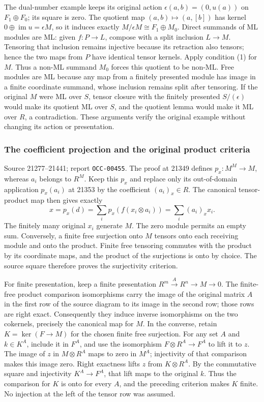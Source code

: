 The dual-number example keeps its original action \(\epsilon(a,b)=(0,u(a))\) on \(F_1\oplus F_0\); its square is zero. The quotient map \((a,b)\mapsto(a,[b])\) has kernel \(0\oplus\operatorname{im}u=\epsilon M\), so it induces exactly \(M/\epsilon M\cong F_1\oplus M_0\). Direct summands of ML modules are ML: given \(f:P\to L\), compose with a split inclusion \(L\to M\). Tensoring that inclusion remains injective because its retraction also tensors; hence the two maps from \(P\) have identical tensor kernels. Apply condition (1) for \(M\). Thus a non-ML summand \(M_0\) forces this quotient to be non-ML. Free modules are ML because any map from a finitely presented module has image in a finite coordinate summand, whose inclusion remains split after tensoring. If the original \(M\) were ML over \(S\), tensor closure with the finitely presented \(S/(\epsilon)\) would make its quotient ML over \(S\), and the quotient lemma would make it ML over \(R\), a contradiction. These arguments verify the original example without changing its action or presentation.

\subsubsection{The coefficient projection and the original product criteria}\label{algebra-proof-012-the-coefficient-projection-and-the-original-product-criteria}

Source 21277--21441; report \texttt{OCC-00455}. The proof at 21349 defines \(p_x:M^M\to M\), whereas \(a_i\) belongs to \(R^M\). Keep this \(p_x\) and replace only its out-of-domain application \(p_x(a_i)\) at 21353 by the coefficient \((a_i)_x\in R\). The canonical tensor-product map then gives exactly \[
x=p_x(d)=\sum_i p_x(f(x_i\otimes a_i))=\sum_i(a_i)_x x_i.
\] The finitely many original \(x_i\) generate \(M\). The zero module permits an empty sum. Conversely, a finite free surjection onto \(M\) tensors onto each receiving module and onto the product. Finite free tensoring commutes with the product by its coordinate maps, and the product of the surjections is onto by choice. The source square therefore proves the surjectivity criterion.

For finite presentation, keep a finite presentation \(R^m\xrightarrow{A}R^n\to M\to0\). The finite-free product comparison isomorphisms carry the image of the original matrix \(A\) in the first row of the source diagram to its image in the second row; those rows are right exact. Consequently they induce inverse isomorphisms on the two cokernels, precisely the canonical map for \(M\). In the converse, retain \(K=\ker(F\to M)\) for the chosen finite free surjection. For any set \(A\) and \(k\in K^A\), include it in \(F^A\), and use the isomorphism \(F\otimes R^A\to F^A\) to lift it to \(z\). The image of \(z\) in \(M\otimes R^A\) maps to zero in \(M^A\); injectivity of that comparison makes this image zero. Right exactness lifts \(z\) from \(K\otimes R^A\). By the commutative square and injectivity \(K^A\to F^A\), that lift maps to the original \(k\). Thus the comparison for \(K\) is onto for every \(A\), and the preceding criterion makes \(K\) finite. No injection at the left of the tensor row was assumed.

